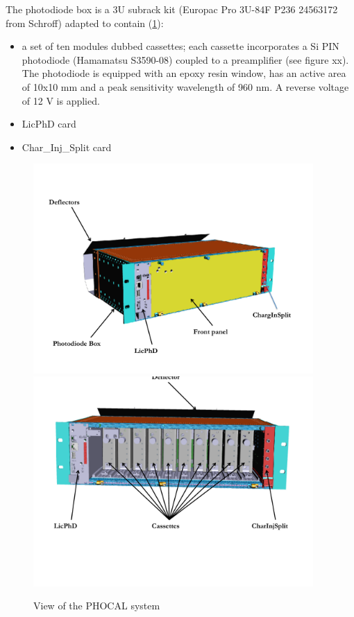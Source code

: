 

The photodiode box is a 3U subrack kit (Europac Pro 3U-84F P236 24563172 from Schroff) adapted to contain (\ref{fig:lasphotodiodebox}):
\begin{itemize}
\item a set of ten modules dubbed cassettes; each cassette incorporates a Si PIN photodiode (Hamamatsu S3590-08) coupled to a preamplifier (see figure xx). The photodiode is equipped with an epoxy resin window, has an active area of 10x10 mm and a peak sensitivity wavelength of 960 nm. A reverse voltage of 12 V is applied.
\item LicPhD card
\item Char_Inj_Split card
\end{itemize}


\begin{figure}[htbp]
\centering
\includegraphics[height=8cm]{figures/Photodiodebox.pdf}
\includegraphics[height=8cm]{figures/Photodiodebox2.pdf}
\caption{View of the PHOCAL system}\label{fig:lasphotodiodebox}
\end{figure}